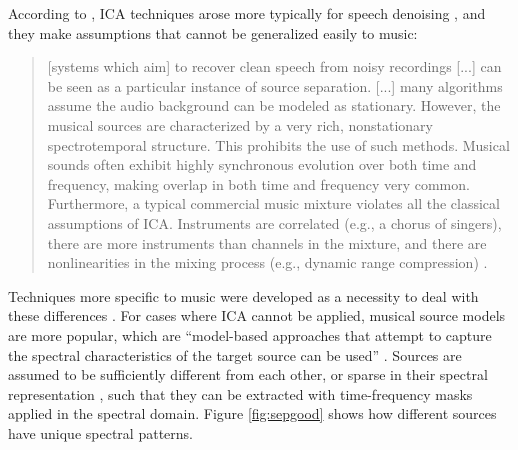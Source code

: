 \documentclass[report.tex]{subfiles}
\begin{document}
According to \citeauthor{musicsepintro1}, ICA techniques arose more typically for speech denoising \parencite{speechsep}, and they make assumptions that cannot be generalized easily to music:

\begin{quote}
	[systems which aim] to recover clean speech from noisy recordings [...] can be seen as a particular instance of source separation. [...] many algorithms assume the audio background can be modeled as stationary. However, the musical sources are characterized by a very rich, nonstationary spectrotemporal structure. This prohibits the use of such methods. Musical sounds often exhibit highly synchronous evolution over both time and frequency, making overlap in both time and frequency very common. Furthermore, a typical commercial music mixture violates all the classical assumptions of ICA. Instruments are correlated (e.g., a chorus of singers), there are more instruments than channels in the mixture, and there are nonlinearities in the mixing process (e.g., dynamic range compression) \parencite[1]{musicsepintro1}.
\end{quote}

Techniques more specific to music were developed as a necessity to deal with these differences \parencite{musicseptechniques1, musicseptechniques2}. For cases where ICA cannot be applied, musical source models are more popular, which are ``model-based approaches that attempt to capture the spectral characteristics of the target source can be used'' \parencite[36]{musicsepgood}. Sources are assumed to be sufficiently different from each other, or sparse in their spectral representation \parencite{musicsepgood}, such that they can be extracted with time-frequency masks applied in the spectral domain. Figure \ref{fig:sepgood} shows how different sources have unique spectral patterns.
\end{document}
